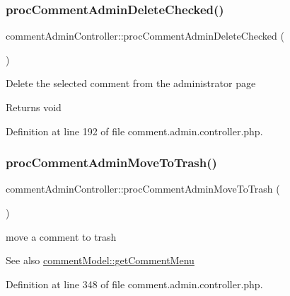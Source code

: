 \subsubsection{\texorpdfstring{proc\+Comment\+Admin\+Delete\+Checked()}{procCommentAdminDeleteChecked()}}
{\footnotesize\ttfamily comment\+Admin\+Controller\+::proc\+Comment\+Admin\+Delete\+Checked (\begin{DoxyParamCaption}{ }\end{DoxyParamCaption})}

Delete the selected comment from the administrator page \begin{DoxyReturn}{Returns}
void 
\end{DoxyReturn}


Definition at line 192 of file comment.\+admin.\+controller.\+php.

\mbox{\label{classcommentAdminController_a714ff343633602dc806e0dc257a12a7f}} 
\subsubsection{\texorpdfstring{proc\+Comment\+Admin\+Move\+To\+Trash()}{procCommentAdminMoveToTrash()}}
{\footnotesize\ttfamily comment\+Admin\+Controller\+::proc\+Comment\+Admin\+Move\+To\+Trash (\begin{DoxyParamCaption}{ }\end{DoxyParamCaption})}



move a comment to trash 

\begin{DoxySeeAlso}{See also}
\hyperlink{classcommentModel_a74e52809b658711e8d63ba7900eb5246}{comment\+Model\+::get\+Comment\+Menu} 
\end{DoxySeeAlso}


Definition at line 348 of file comment.\+admin.\+controller.\+php.

\mbox{\label{classcommentAdminController_aede089003a6f45e3982a6a7e97b63cdf}} 
